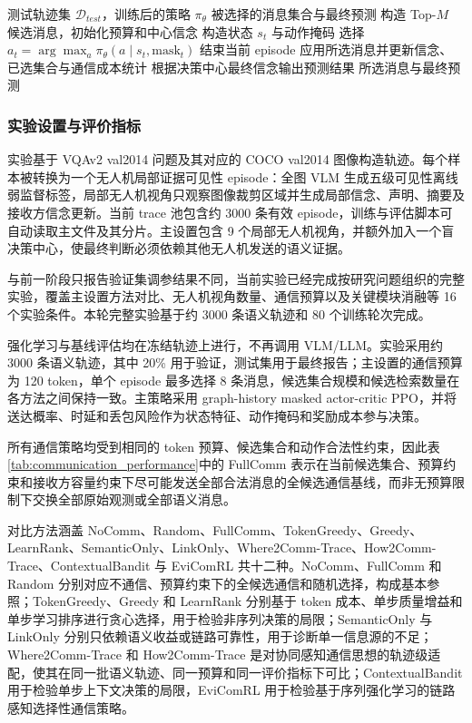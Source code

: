 \begin{algorithm}[!tb]
\caption{EviComRL 推理过程}
\label{alg:evicom_infer}
\renewcommand{\algorithmicrequire}{\textbf{输入：}}
\renewcommand{\algorithmicensure}{\textbf{输出：}}
\footnotesize
\begin{algorithmic}[1]
\REQUIRE 测试轨迹集 $\mathcal{D}_{test}$，训练后的策略 $\pi_{\theta}$
\ENSURE 被选择的消息集合与最终预测
    \STATE 构造 Top-$M$ 候选消息，初始化预算和中心信念
        \STATE 构造状态 $s_t$ 与动作掩码
        \STATE 选择 $a_t=\arg\max_a\pi_{\theta}(a\mid s_t,\mathrm{mask}_t)$
            \STATE 结束当前 episode
        \ELSE
            \STATE 应用所选消息并更新信念、已选集合与通信成本统计
        \ENDIF
    \ENDWHILE
    \STATE 根据决策中心最终信念输出预测结果
\ENDFOR
\RETURN 所选消息与最终预测
\end{algorithmic}
\end{algorithm}
\subsubsection{实验设置与评价指标}
实验基于 VQAv2 val2014 问题及其对应的 COCO val2014 图像构造轨迹。每个样本被转换为一个无人机局部证据可见性 episode：全图 VLM 生成五级可见性离线弱监督标签，局部无人机视角只观察图像裁剪区域并生成局部信念、声明、摘要及接收方信念更新。当前 trace 池包含约 3000 条有效 episode，训练与评估脚本可自动读取主文件及其分片。主设置包含 9 个局部无人机视角，并额外加入一个盲决策中心，使最终判断必须依赖其他无人机发送的语义证据。

与前一阶段只报告验证集调参结果不同，当前实验已经完成按研究问题组织的完整实验，覆盖主设置方法对比、无人机视角数量、通信预算以及关键模块消融等 16 个实验条件。本轮完整实验基于约 3000 条语义轨迹和 80 个训练轮次完成。

强化学习与基线评估均在冻结轨迹上进行，不再调用 VLM/LLM。实验采用约 3000 条语义轨迹，其中 20\% 用于验证，测试集用于最终报告；主设置的通信预算为 120 token，单个 episode 最多选择 8 条消息，候选集合规模和候选检索数量在各方法之间保持一致。主策略采用 graph-history masked actor-critic PPO，并将送达概率、时延和丢包风险作为状态特征、动作掩码和奖励成本参与决策。

所有通信策略均受到相同的 token 预算、候选集合和动作合法性约束，因此表\ref{tab:communication_performance}中的 FullComm 表示在当前候选集合、预算约束和接收方容量约束下尽可能发送全部合法消息的全候选通信基线，而非无预算限制下交换全部原始观测或全部语义消息。

对比方法涵盖 NoComm、Random、FullComm、TokenGreedy、Greedy、LearnRank、SemanticOnly、LinkOnly、Where2Comm-Trace、How2Comm-Trace、ContextualBandit 与 EviComRL 共十二种。NoComm、FullComm 和 Random 分别对应不通信、预算约束下的全候选通信和随机选择，构成基本参照；TokenGreedy、Greedy 和 LearnRank 分别基于 token 成本、单步质量增益和单步学习排序进行贪心选择，用于检验非序列决策的局限；SemanticOnly 与 LinkOnly 分别只依赖语义收益或链路可靠性，用于诊断单一信息源的不足；Where2Comm-Trace 和 How2Comm-Trace 是对协同感知通信思想的轨迹级适配，使其在同一批语义轨迹、同一预算和同一评价指标下可比；ContextualBandit 用于检验单步上下文决策的局限，EviComRL 用于检验基于序列强化学习的链路感知选择性通信策略。

